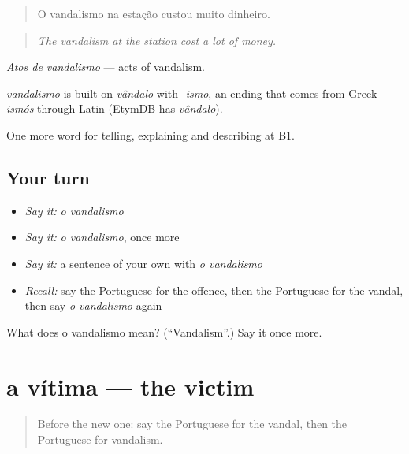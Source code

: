 \begin{quote}
O vandalismo na estação custou muito dinheiro.
\end{quote}

\begin{quote}
\emph{The vandalism at the station cost a lot of money.}
\end{quote}

\emph{Atos de vandalismo} — acts of vandalism.

\begin{cousinweb}
\emph{vandalismo} is built on \emph{vândalo} with \emph{-ismo}, an ending that comes from Greek \emph{-ismós} through Latin (EtymDB has \emph{vândalo}).
\end{cousinweb}

\begin{grammarlens}[title={What you've built}]
One more word for telling, explaining and describing at B1.
\end{grammarlens}

\subsection*{Your turn}
\begin{itemize}
\raggedright
  \item \emph{Say it:} \emph{o vandalismo}
  \item \emph{Say it:} \emph{o vandalismo}, once more
  \item \emph{Say it:} a sentence of your own with \emph{o vandalismo}
  \item \emph{Recall:} say the Portuguese for the offence, then the Portuguese for the vandal, then say \emph{o vandalismo} again
\end{itemize}

\begin{tcolorbox}[breakable,colback=teal!4,colframe=teal!35!black,title={Before you move on}]
What does o vandalismo mean? (\textquotedblleft{}Vandalism\textquotedblright{}.) Say it once more.
\end{tcolorbox}
\section[a vítima]{a vítima — the victim}

\label{lesson:PT-C286-vitima}



\begin{quote}
Before the new one: say the Portuguese for the vandal, then the Portuguese for vandalism.
\end{quote}

